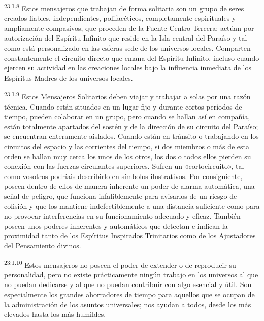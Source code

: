 \par
\textsuperscript{23:1.8} Estos mensajeros que trabajan de forma solitaria son un grupo de seres creados fiables, independientes, polifacéticos, completamente espirituales y ampliamente compasivos, que proceden de la Fuente-Centro Tercera; actúan por autorización del Espíritu Infinito que reside en la Isla central del Paraíso y tal como está personalizado en las esferas sede de los universos locales. Comparten constantemente el circuito directo que emana del Espíritu Infinito, incluso cuando ejercen su actividad en las creaciones locales bajo la influencia inmediata de los Espíritus Madres de los universos locales.

\par
\textsuperscript{23:1.9} Estos Mensajeros Solitarios deben viajar y trabajar a solas por una razón técnica. Cuando están situados en un lugar fijo y durante cortos períodos de tiempo, pueden colaborar en un grupo, pero cuando se hallan así en compañía, están totalmente apartados del sostén y de la dirección de su circuito del Paraíso; se encuentran enteramente aislados. Cuando están en tránsito o trabajando en los circuitos del espacio y las corrientes del tiempo, si dos miembros o más de esta orden se hallan muy cerca los unos de los otros, los dos o todos ellos pierden su conexión con las fuerzas circulantes superiores. Sufren un «cortocircuito», tal como vosotros podríais describirlo en símbolos ilustrativos. Por consiguiente, poseen dentro de ellos de manera inherente un poder de alarma automática, una señal de peligro, que funciona infaliblemente para avisarlos de un riesgo de colisión y que los mantiene indefectiblemente a una distancia suficiente como para no provocar interferencias en su funcionamiento adecuado y eficaz. También poseen unos poderes inherentes y automáticos que detectan e indican la proximidad tanto de los Espíritus Inspirados Trinitarios como de los Ajustadores del Pensamiento divinos.

\par
\textsuperscript{23:1.10} Estos mensajeros no poseen el poder de extender o de reproducir su personalidad, pero no existe prácticamente ningún trabajo en los universos al que no puedan dedicarse y al que no puedan contribuir con algo esencial y útil. Son especialmente los grandes ahorradores de tiempo para aquellos que se ocupan de la administración de los asuntos universales; nos ayudan a todos, desde los más elevados hasta los más humildes.

